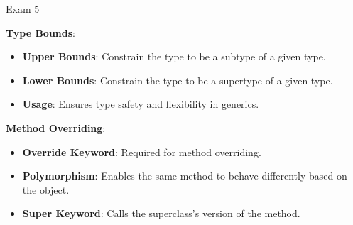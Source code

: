 \begin{examnotes}{Exam 5}
\begin{highlight}
        \textbf{Type Bounds}:
        \begin{itemize}
            \item \textbf{Upper Bounds}: Constrain the type to be a subtype of a given type.
            \item \textbf{Lower Bounds}: Constrain the type to be a supertype of a given type.
            \item \textbf{Usage}: Ensures type safety and flexibility in generics.
        \end{itemize}
    
        \textbf{Method Overriding}:
        \begin{itemize}
            \item \textbf{Override Keyword}: Required for method overriding.
            \item \textbf{Polymorphism}: Enables the same method to behave differently based on the object.
            \item \textbf{Super Keyword}: Calls the superclass's version of the method.
        \end{itemize}
    \end{highlight}
\end{examnotes}